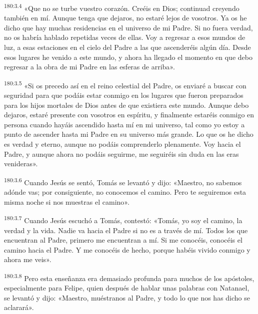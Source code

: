 \par 
\textsuperscript{180:3.4} «Que no se turbe vuestro corazón. Creéis en Dios; continuad creyendo también en mí. Aunque tenga que dejaros, no estaré lejos de vosotros. Ya os he dicho que hay muchas residencias en el universo de mi Padre. Si no fuera verdad, no os habría hablado repetidas veces de ellas. Voy a regresar a esos mundos de luz, a esas estaciones en el cielo del Padre a las que ascenderéis algún día. Desde esos lugares he venido a este mundo, y ahora ha llegado el momento en que debo regresar a la obra de mi Padre en las esferas de arriba».

\par 
\textsuperscript{180:3.5} «Si os precedo así en el reino celestial del Padre, os enviaré a buscar con seguridad para que podáis estar conmigo en los lugares que fueron preparados para los hijos mortales de Dios antes de que existiera este mundo. Aunque debo dejaros, estaré presente con vosotros en espíritu, y finalmente estaréis conmigo en persona cuando hayáis ascendido hasta mí en mi universo, tal como yo estoy a punto de ascender hasta mi Padre en su universo más grande. Lo que os he dicho es verdad y eterno, aunque no podáis comprenderlo plenamente. Voy hacia el Padre, y aunque ahora no podáis seguirme, me seguiréis sin duda en las eras venideras».

\par 
\textsuperscript{180:3.6} Cuando Jesús se sentó, Tomás se levantó y dijo: «Maestro, no sabemos adónde vas; por consiguiente, no conocemos el camino. Pero te seguiremos esta misma noche si nos muestras el camino».

\par 
\textsuperscript{180:3.7} Cuando Jesús escuchó a Tomás, contestó: «Tomás, yo soy el camino, la verdad y la vida. Nadie va hacia el Padre si no es a través de mí. Todos los que encuentran al Padre, primero me encuentran a mí. Si me conocéis, conocéis el camino hacia el Padre. Y me conocéis de hecho, porque habéis vivido conmigo y ahora me veis».

\par 
\textsuperscript{180:3.8} Pero esta enseñanza era demasiado profunda para muchos de los apóstoles, especialmente para Felipe, quien después de hablar unas palabras con Natanael, se levantó y dijo: «Maestro, muéstranos al Padre, y todo lo que nos has dicho se aclarará».

